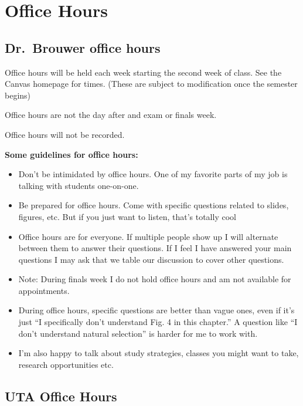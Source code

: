 \documentclass[
]{book}
\providecommand{\tightlist}{%
  \setlength{\itemsep}{0pt}\setlength{\parskip}{0pt}}
\begin{document}
\hypertarget{officehours}{%
\chapter{Office Hours}\label{officehours}}

\hypertarget{dr.-brouwer-office-hours}{%
\section{Dr.~Brouwer office hours}\label{dr.-brouwer-office-hours}}

Office hours will be held each week starting the second week of class. See the Canvas homepage for times. (These are subject to modification once the semester begins)

Office hours are not the day after and exam or finals week.

Office hours will not be recorded.

\textbf{Some guidelines for office hours:}

\begin{itemize}
\tightlist
\item
  Don't be intimidated by office hours. One of my favorite parts of my job is talking with students one-on-one.
\item
  Be prepared for office hours. Come with specific questions related to slides, figures, etc. But if you just want to listen, that's totally cool
\item
  Office hours are for everyone. If multiple people show up I will alternate between them to answer their questions. If I feel I have answered your main questions I may ask that we table our discussion to cover other questions.
\item
  Note: During finals week I do not hold office hours and am not available for appointments.
\item
  During office hours, specific questions are better than vague ones, even if it's just ``I specifically don't understand Fig. 4 in this chapter.'' A question like ``I don't understand natural selection'' is harder for me to work with.
\item
  I'm also happy to talk about study strategies, classes you might want to take, research opportunities etc.
\end{itemize}

\hypertarget{uta-office-hours}{%
\section{UTA Office Hours}\label{uta-office-hours}}
\end{document}
